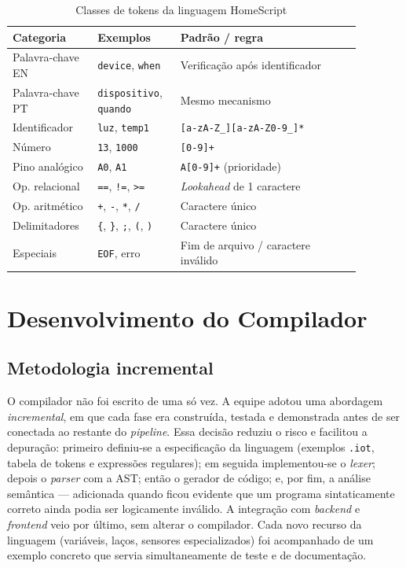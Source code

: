 \documentclass[conference]{IEEEtran}
\begin{document}
\begin{table}[htbp]
\caption{Classes de tokens da linguagem HomeScript}
\label{tab:tokens}
\centering
\begin{tabular}{p{0.21\linewidth}p{0.20\linewidth}p{0.47\linewidth}}
\toprule
\textbf{Categoria} & \textbf{Exemplos} & \textbf{Padrão / regra} \\
\midrule
Palavra-chave EN & \texttt{device}, \texttt{when} & Verificação após identificador \\
Palavra-chave PT & \texttt{dispositivo}, \texttt{quando} & Mesmo mecanismo \\
Identificador & \texttt{luz}, \texttt{temp1} & \texttt{[a-zA-Z\_][a-zA-Z0-9\_]*} \\
Número & \texttt{13}, \texttt{1000} & \texttt{[0-9]+} \\
Pino analógico & \texttt{A0}, \texttt{A1} & \texttt{A[0-9]+} (prioridade) \\
Op. relacional & \texttt{==}, \texttt{!=}, \texttt{>=} & \emph{Lookahead} de 1 caractere \\
Op. aritmético & \texttt{+}, \texttt{-}, \texttt{*}, \texttt{/} & Caractere único \\
Delimitadores & \texttt{\{}, \texttt{\}}, \texttt{;}, \texttt{(}, \texttt{)} & Caractere único \\
Especiais & \texttt{EOF}, erro & Fim de arquivo / caractere inválido \\
\bottomrule
\end{tabular}
\end{table}

\section{Desenvolvimento do Compilador}
\label{sec:compilador}

\subsection{Metodologia incremental}

O compilador não foi escrito de uma só vez. A equipe adotou uma
abordagem \emph{incremental}, em que cada fase era construída, testada e
demonstrada antes de ser conectada ao restante do \emph{pipeline}. Essa
decisão reduziu o risco e facilitou a depuração: primeiro definiu-se a
especificação da linguagem (exemplos \texttt{.iot}, tabela de tokens e
expressões regulares); em seguida implementou-se o \emph{lexer}; depois o
\emph{parser} com a AST; então o gerador de código; e, por fim, a análise
semântica --- adicionada quando ficou evidente que um programa
sintaticamente correto ainda podia ser logicamente inválido. A integração
com \emph{backend} e \emph{frontend} veio por último, sem alterar o
compilador. Cada novo recurso da linguagem (variáveis, laços, sensores
especializados) foi acompanhado de um exemplo concreto que servia
simultaneamente de teste e de documentação.
\end{document}

